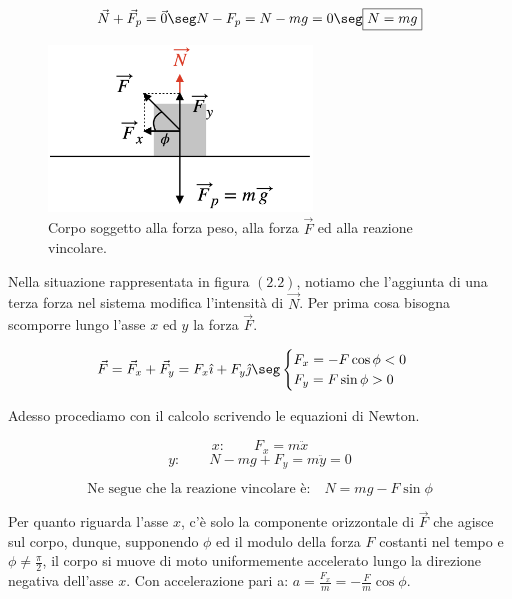 \begin{equation}
\vec N + \vec F_p = \vec 0 \seg N - F_p = N - mg = 0 \seg \boxed{N = mg}
\end{equation}

\begin{figure}[htbp]
\begin{center}
\includegraphics[width=7cm]{images/NPF.png}
\caption{Corpo soggetto alla forza peso, alla forza $\vec F$ ed alla reazione vincolare.}
\label{default}
\end{center}
\end{figure}

Nella situazione rappresentata in figura $(2.2)$, notiamo che l'aggiunta di una terza forza nel sistema modifica l'intensità di $\vec N$. Per prima cosa bisogna scomporre lungo l'asse $x$ ed $y$ la forza $\vec F$.

\begin{equation}
\vec F = \vec F_x + \vec F_y = F_x\hat\imath + F_y\hat\jmath\seg 
\begin{cases}
F_x = -F\cos\phi <0\\
F_y = F\sin\phi>0
\end{cases}
\end{equation}

Adesso procediamo con il calcolo scrivendo le equazioni di Newton.

\begin{equation}
x:\quad\quad F_x = m\ddot x
\end{equation}
\begin{equation}
y:\quad\quad N-mg+F_y = m\ddot y = 0
\end{equation}

\begin{equation}
\mbox{Ne segue che la reazione vincolare è:}\quad \boxed{N = mg -F\sin\phi}
\end{equation}

Per quanto riguarda l'asse $x$, c'è solo la componente orizzontale di $\vec F$ che agisce sul corpo, dunque, supponendo $\phi$ ed il modulo della forza $F$ costanti nel tempo e $\phi\ne\frac\pi2$, il corpo si muove di moto uniformemente accelerato lungo la direzione negativa dell'asse $x$.
Con accelerazione pari a: $a = \frac{F_x}{m} = -\frac Fm\cos\phi$.



